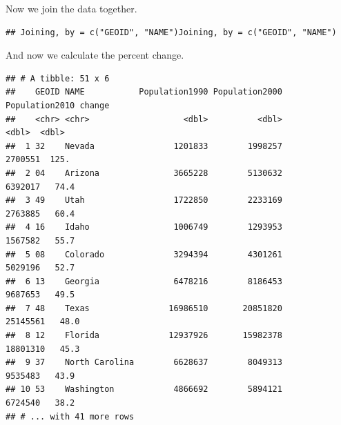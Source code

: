 \documentclass[]{book}
\newenvironment{Shaded}{\begin{snugshade}}{\end{snugshade}}
\newcommand{\DataTypeTok}[1]{\textcolor[rgb]{0.13,0.29,0.53}{#1}}
\newcommand{\DecValTok}[1]{\textcolor[rgb]{0.00,0.00,0.81}{#1}}
\newcommand{\KeywordTok}[1]{\textcolor[rgb]{0.13,0.29,0.53}{\textbf{#1}}}
\newcommand{\NormalTok}[1]{#1}
\newcommand{\OperatorTok}[1]{\textcolor[rgb]{0.81,0.36,0.00}{\textbf{#1}}}
\newcommand{\StringTok}[1]{\textcolor[rgb]{0.31,0.60,0.02}{#1}}
\begin{document}
Now we join the data together.

\begin{Shaded}
\end{Shaded}

\begin{verbatim}
## Joining, by = c("GEOID", "NAME")Joining, by = c("GEOID", "NAME")
\end{verbatim}

And now we calculate the percent change.

\begin{Shaded}
\end{Shaded}

\begin{verbatim}
## # A tibble: 51 x 6
##    GEOID NAME           Population1990 Population2000 Population2010 change
##    <chr> <chr>                   <dbl>          <dbl>          <dbl>  <dbl>
##  1 32    Nevada                1201833        1998257        2700551  125. 
##  2 04    Arizona               3665228        5130632        6392017   74.4
##  3 49    Utah                  1722850        2233169        2763885   60.4
##  4 16    Idaho                 1006749        1293953        1567582   55.7
##  5 08    Colorado              3294394        4301261        5029196   52.7
##  6 13    Georgia               6478216        8186453        9687653   49.5
##  7 48    Texas                16986510       20851820       25145561   48.0
##  8 12    Florida              12937926       15982378       18801310   45.3
##  9 37    North Carolina        6628637        8049313        9535483   43.9
## 10 53    Washington            4866692        5894121        6724540   38.2
## # ... with 41 more rows
\end{verbatim}
\end{document}

